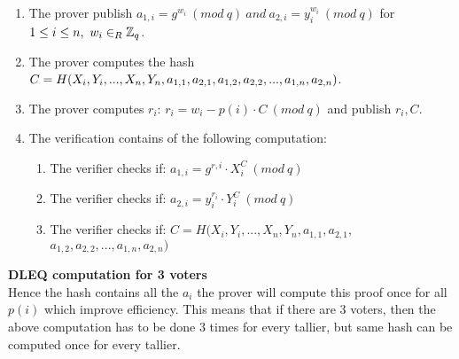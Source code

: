 \begin{enumerate}
    \item The prover publish  \begin{math}a_{1,i}=g^{w_i} \ (mod\ q)  \ and \ a_{2,i}=y_i^{w_i} \ (mod\ q)\end{math}  for  \begin{math} 1\leq i \leq n, \ w_i\in_R \mathbb{Z}_q \end{math}.
    \item The prover computes the hash \begin{math}C=H(X_i,Y_i,...,X_n,Y_n,a_{1,1},a_{2,1},\\a_{1,2},a_{2,2},...,a_{1,n},a_{2,n})\end{math}.
    \item The prover computes \begin{math}r_i\end{math}:  \begin{math}r_i=w_i-p(i)  \cdot  C \ (mod\ q)\end{math} and publish \begin{math}r_i,C\end{math}.
    \item The verification contains of the following computation:
    \begin{enumerate}        
        \item The verifier checks if:   \begin{math}a_{1,i} = g^{r,i} \cdot X_i^C \ (mod\ q) \end{math}
        \item The verifier checks if:  \begin{math} a_{2,i}=y_i^{r_{i}}  \cdot  Y_i^C \ (mod\ q)\end{math}
         \item The verifier checks if:  $C=H(X_i,Y_i,...,X_n,Y_n,a_{1,1},a_{2,1},$\\
$a_{1,2},a_{2,2},...,a_{1,n},a_{2,n})$
    \end{enumerate}
\end{enumerate}

\noindent 
\textbf{DLEQ computation for 3 voters}\\
Hence the hash contains all the  \begin{math}a_i \end{math} the prover will compute this proof once for all  \begin{math}p(i) \end{math} which improve efficiency. This means that if there are 3 voters, then the above computation has to be done 3 times for every tallier, but same hash can be computed once for every tallier. 



